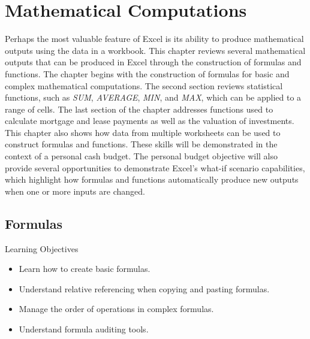 \chapter{Mathematical Computations}\label{ch02:computations}

Perhaps the most valuable feature of Excel is its ability to produce mathematical outputs using the data in a workbook. This chapter reviews several mathematical outputs that can be produced in Excel through the construction of formulas and functions. The chapter begins with the construction of formulas for basic and complex mathematical computations. The second section reviews statistical functions, such as \textit{SUM}, \textit{AVERAGE}, \textit{MIN}, and \textit{MAX}, which can be applied to a range of cells. The last section of the chapter addresses functions used to calculate mortgage and lease payments as well as the valuation of investments. This chapter also shows how data from multiple worksheets can be used to construct formulas and functions. These skills will be demonstrated in the context of a personal cash budget. The personal budget objective will also provide several opportunities to demonstrate Excel's what-if scenario capabilities, which highlight how formulas and functions automatically produce new outputs when one or more inputs are changed.

\section{Formulas}

\begin{center}
	\begin{objbox}{Learning Objectives}
		\begin{itemize}
			\setlength{\itemsep}{0pt}
			\setlength{\parskip}{0pt}
			\setlength{\parsep}{0pt}
			
			\item Learn how to create basic formulas.
			\item Understand relative referencing when copying and pasting formulas.
			\item Manage the order of operations in complex formulas.
			\item Understand formula auditing tools.

		\end{itemize}
	\end{objbox}
\end{center}

